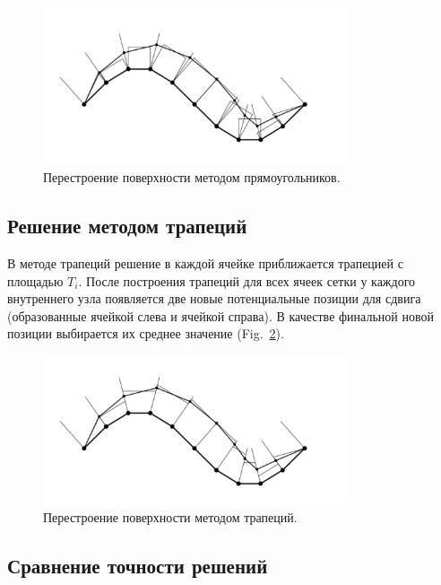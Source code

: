 \documentclass[
11pt,%
tightenlines,%
twoside,%
onecolumn,%
nofloats,%
nobibnotes,%
nofootinbib,%
superscriptaddress,%
noshowpacs,%
centertags]%
{revtex4}
\begin{document}
\begin{figure}[h]
\setcaptionmargin{5mm}
\onelinecaptionstrue
\includegraphics[width=0.8\textwidth]{pics/grid_rectangles.pdf}
\caption{Перестроение поверхности методом прямоугольников.}
\label{fig:grid_rectangles}
\end{figure}

\subsection{Решение методом трапеций}

В методе трапеций решение в каждой ячейке приближается трапецией с площадью $T_i$.
После построения трапеций для всех ячеек сетки у каждого внутреннего узла появляется две новые потенциальные позиции для сдвига (образованные ячейкой слева и ячейкой справа).
В качестве финальной новой позиции выбирается их среднее значение (Fig.~\ref{fig:grid_trapeziums}).

\begin{figure}[h]
\setcaptionmargin{5mm}
\onelinecaptionstrue
\includegraphics[width=0.8\textwidth]{pics/grid_trapeziums.pdf}
\caption{Перестроение поверхности методом трапеций.}
\label{fig:grid_trapeziums}
\end{figure}

\subsection{Сравнение точности решений}
\end{document}
